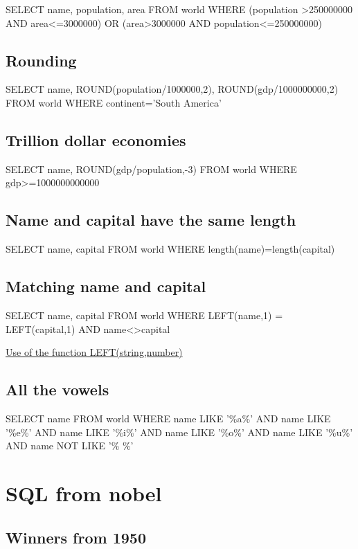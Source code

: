 \documentclass[10pt, oneside]{article}
\begin{document}
SELECT name, population, area FROM world WHERE (population >250000000 AND area<=3000000) OR (area>3000000 AND population<=250000000)

\subsection{Rounding}

SELECT name, ROUND(population/1000000,2), ROUND(gdp/1000000000,2) FROM world WHERE continent='South America'

\subsection{Trillion dollar economies}

SELECT name, ROUND(gdp/population,\color{red}-3\color{black}) FROM world WHERE gdp>=1000000000000

\subsection{Name and capital have the same length}

SELECT name, capital FROM world WHERE length(name)=length(capital)

\subsection{Matching name and capital}

\color{red}SELECT name, capital FROM world 
WHERE LEFT(name,1) = LEFT(capital,1)
AND name<>capital

\color{black}\href{https://sqlzoo.net/wiki/LEFT}{Use of the function LEFT(string,number)}

\subsection{All the vowels}

SELECT name FROM world WHERE name LIKE '\%a\%' AND name LIKE '\%e\%' AND name LIKE '\%i\%' AND name LIKE '\%o\%' AND name LIKE '\%u\%' AND name NOT LIKE '\% \%'

\section{SQL from nobel}

\subsection{Winners from 1950}
\end{document}

